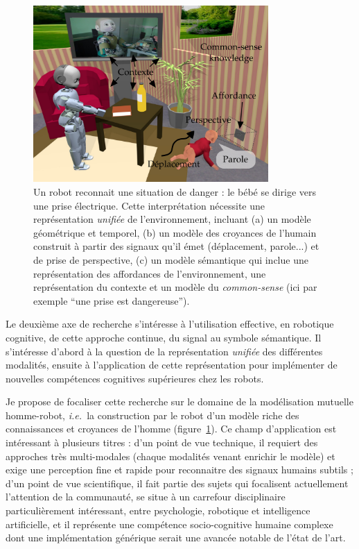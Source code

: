 \documentclass[a4paper]{article}
\newcommand{\ie}{{\textit{i.e.~}}}
\begin{document}
\begin{figure}
    \centering
\includegraphics[width=0.8\textwidth]{figs/signaux}
\caption{\small Un robot reconnait une situation de danger : le bébé se dirige
    vers une prise électrique. Cette interprétation nécessite une représentation
    \emph{unifiée} de l'environnement, incluant (a) un modèle géométrique et
    temporel, (b) un modèle des croyances de l'humain construit à partir des
    signaux qu'il émet (déplacement, parole...) et de prise de perspective, (c)
    un modèle sémantique qui inclue une représentation des affordances de
    l'environnement, une représentation du contexte et un modèle du
    \emph{common-sense} (ici par exemple ``une prise est dangereuse'').}

\label{babyplug}
\end{figure}

Le deuxième axe de recherche s'intéresse à l'utilisation effective, en robotique
cognitive, de cette approche continue, du signal au symbole sémantique. Il
s'intéresse d'abord à la question de la représentation \emph{unifiée} des
différentes modalités, ensuite à l'application de cette représentation pour
implémenter de nouvelles compétences cognitives supérieures chez les robots.

Je propose de focaliser cette recherche sur le domaine de la modélisation
mutuelle homme-robot, \ie la construction par le robot d'un modèle riche des
connaissances et croyances de l'homme (figure~\ref{babyplug}). Ce champ
d'application est intéressant à plusieurs titres : d'un point de vue technique,
il requiert des approches très multi-modales (chaque modalités venant enrichir
le modèle) et exige une perception fine et rapide pour reconnaitre des signaux
humains subtils ; d'un point de vue scientifique, il fait partie des sujets qui
focalisent actuellement l'attention de la communauté, se situe à un carrefour
disciplinaire particulièrement intéressant, entre psychologie, robotique et
intelligence artificielle, et il représente une compétence socio-cognitive
humaine complexe dont une implémentation générique serait une avancée notable de
l'état de l'art.
\end{document}
